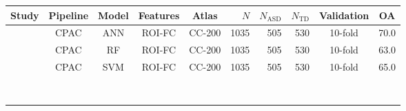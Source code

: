 \documentclass[10pt]{article}
\begin{document}
\begin{table}
  \small
  \centering
  \begin{tabular}{lccccrrrcc}
    \toprule
    Study                                                         & Pipeline & Model  & Features & Atlas  & \(N\) & \(N_\text{ASD}\) & \(N_{\text{TD}}\) & Validation & OA \\
    \midrule
    \citet{heinsfeldIdentificationAutismSpectrum2018}             &     CPAC &   ANN  &  ROI-FC  & CC-200 & 1035  &  505  &  530  &  10-fold   &       70.0        \\
    \citet{heinsfeldIdentificationAutismSpectrum2018}             &     CPAC &   RF   &  ROI-FC  & CC-200 & 1035  &  505  &  530  &  10-fold   &       63.0        \\
    \citet{heinsfeldIdentificationAutismSpectrum2018}             &     CPAC &   SVM  &  ROI-FC  & CC-200 & 1035  &  505  &  530  &  10-fold   &       65.0        \\
    \citet{eslamiASDDiagNetHybridLearning2019}                    &          &        &          &        &       &       &       &            &                  \\
    \citet{yinDiagnosisAutismSpectrum2021}                        &          &        &          &        &       &       &       &            &                  \\
    \citet{liMultisiteFMRIAnalysis2020}                           &          &        &          &        &       &       &       &            &                  \\
    \citet{el-gazzarHybrid3DCNN3DCLSTM2019}                       &          &        &          &        &       &       &       &            &                  \\
    \citet{shaoClassificationASDBased2021}                        &          &        &          &        &       &       &       &            &                  \\
    \citet{dekhilUsingRestingState2018}                           &          &        &          &        &       &       &       &            &                  \\
    \citet{parisotDiseasePredictionUsing2018}                     &          &        &          &        &       &       &       &            &                  \\
    \citet{sakaiMachineLearningStudies2019}                       &          &        &          &        &       &       &       &            &                  \\

\end{tabular}
\end{table}
\end{document}
